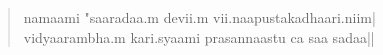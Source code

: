 \documentclass[a6paper]{article}
\begin{document}
\begin{verse}
\begin{center}
namaami "saaradaa.m devii.m vii.naapustakadhaari.niim|\\
vidyaarambha.m kari.syaami prasannaastu ca saa sadaa||
\end{center}
\end{verse}
\end{document}
